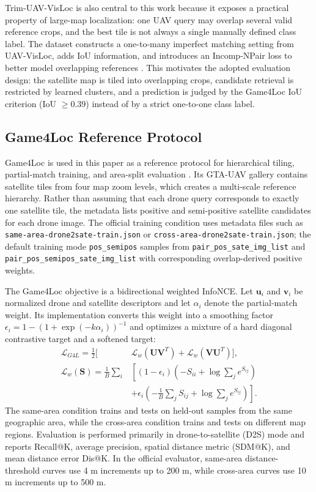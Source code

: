 \documentclass[conference]{IEEEtran}
\begin{document}
Trim-UAV-VisLoc is also central to this work because it exposes a practical
property of large-map localization: one UAV query may overlap several valid
reference crops, and the best tile is not always a single manually defined
class label. The dataset constructs a one-to-many imperfect matching setting
from UAV-VisLoc, adds IoU information, and introduces an Incomp-NPair loss to
better model overlapping references \cite{li2025onetomany}. This motivates the
adopted evaluation design: the satellite map is tiled into overlapping crops,
candidate retrieval is restricted by learned clusters, and a prediction is
judged by the Game4Loc IoU criterion (IoU $\geq 0.39$) instead of by a
strict one-to-one class label.

\subsection{Game4Loc Reference Protocol}
Game4Loc is used in this paper as a reference protocol for hierarchical
tiling, partial-match training, and area-split evaluation
\cite{ji2024game4loc}. Its GTA-UAV gallery contains satellite tiles from four
map zoom levels, which creates a multi-scale reference hierarchy. Rather than
assuming that each drone query corresponds to exactly one satellite tile, the
metadata lists positive and semi-positive satellite candidates for each drone
image. The official training condition uses metadata files such as
\texttt{same-area-drone2sate-train.json} or
\texttt{cross-area-drone2sate-train.json}; the default training mode
\texttt{pos\_semipos} samples from \texttt{pair\_pos\_sate\_img\_list} and
\texttt{pair\_pos\_semipos\_sate\_img\_list} with corresponding
overlap-derived positive weights.

The Game4Loc objective is a bidirectional weighted InfoNCE. Let
$\mathbf{u}_i$ and $\mathbf{v}_i$ be normalized drone and satellite
descriptors and let $\alpha_i$ denote the partial-match weight. Its
implementation converts this weight into a smoothing factor
$\epsilon_i=1-(1+\exp(-k\alpha_i))^{-1}$ and optimizes a mixture of a hard
diagonal contrastive target and a softened target:
\begin{equation}
\begin{split}
\mathcal{L}_{G4L} =
\frac{1}{2}\big[
&\mathcal{L}_w(\mathbf{U}\mathbf{V}^{T})+
\mathcal{L}_w(\mathbf{V}\mathbf{U}^{T})\big],\\
\mathcal{L}_w(\mathbf{S}) =
\frac{1}{B}\sum_i
&\left[
(1-\epsilon_i)\left(-S_{ii}+\log\sum_j e^{S_{ij}}\right)\right.\\
&\left.+\epsilon_i\left(-\frac{1}{B}\sum_j S_{ij}+
\log\sum_j e^{S_{ij}}\right)
\right].
\end{split}
\end{equation}
The same-area condition trains and tests on held-out samples from the same
geographic area, while the cross-area condition trains and tests on different
map regions. Evaluation is performed primarily in drone-to-satellite (D2S)
mode and reports Recall@K, average precision, spatial distance metric
(SDM@K), and mean distance error Dis@K. In the official evaluator, same-area
distance-threshold curves use 4 m increments up to 200 m, while cross-area
curves use 10 m increments up to 500 m.
\end{document}
